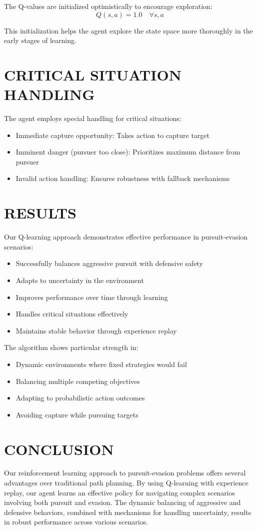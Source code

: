 \documentclass[letterpaper, 10 pt, conference]{ieeeconf}
\begin{document}
The Q-values are initialized optimistically to encourage exploration:
\[
Q(s,a) = 1.0 \quad \forall s,a
\]

This initialization helps the agent explore the state space more thoroughly in the early stages of learning.

\section{CRITICAL SITUATION HANDLING}
The agent employs special handling for critical situations:
\begin{itemize}
    \item Immediate capture opportunity: Takes action to capture target
    \item Imminent danger (pursuer too close): Prioritizes maximum distance from pursuer
    \item Invalid action handling: Ensures robustness with fallback mechanisms
\end{itemize}

\section{RESULTS}
Our Q-learning approach demonstrates effective performance in pursuit-evasion scenarios:
\begin{itemize}
    \item Successfully balances aggressive pursuit with defensive safety
    \item Adapts to uncertainty in the environment
    \item Improves performance over time through learning
    \item Handles critical situations effectively
    \item Maintains stable behavior through experience replay
\end{itemize}

The algorithm shows particular strength in:
\begin{itemize}
    \item Dynamic environments where fixed strategies would fail
    \item Balancing multiple competing objectives
    \item Adapting to probabilistic action outcomes
    \item Avoiding capture while pursuing targets
\end{itemize}

\section{CONCLUSION}
Our reinforcement learning approach to pursuit-evasion problems offers several advantages over traditional path planning. By using Q-learning with experience replay, our agent learns an effective policy for navigating complex scenarios involving both pursuit and evasion. The dynamic balancing of aggressive and defensive behaviors, combined with mechanisms for handling uncertainty, results in robust performance across various scenarios.
\end{document}
